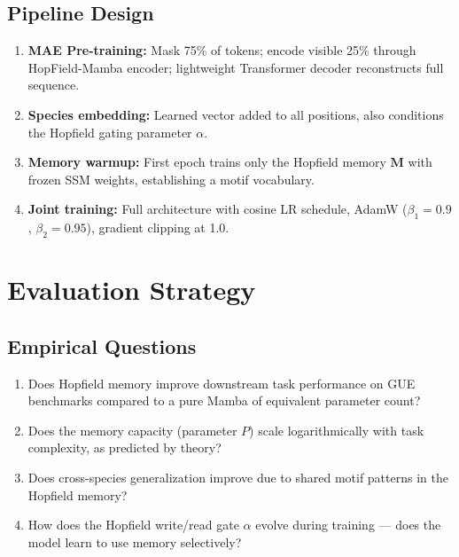 \documentclass[11pt,a4paper]{article}
\numberwithin{equation}{section}
\begin{document}
\subsection{Pipeline Design}

\begin{enumerate}
    \item \textbf{MAE Pre-training:} Mask 75\% of tokens; encode visible 25\% through
    HopField-Mamba encoder; lightweight Transformer decoder reconstructs full sequence.
    \item \textbf{Species embedding:} Learned vector added to all positions, also
    conditions the Hopfield gating parameter $\alpha$.
    \item \textbf{Memory warmup:} First epoch trains only the Hopfield memory $\bm{M}$
    with frozen SSM weights, establishing a motif vocabulary.
    \item \textbf{Joint training:} Full architecture with cosine LR schedule,
    AdamW ($\beta_1 = 0.9$, $\beta_2 = 0.95$), gradient clipping at 1.0.
\end{enumerate}

\section{Evaluation Strategy}
\label{sec:eval}

\subsection{Empirical Questions}

\begin{enumerate}
    \item Does Hopfield memory improve downstream task performance on GUE benchmarks
    \cite{luo2024gue} compared to a pure Mamba of equivalent parameter count?
    \item Does the memory capacity (parameter $P$) scale logarithmically with task
    complexity, as predicted by theory?
    \item Does cross-species generalization improve due to shared motif patterns in
    the Hopfield memory?
    \item How does the Hopfield write/read gate $\alpha$ evolve during training ---
    does the model learn to use memory selectively?
\end{enumerate}
\end{document}

